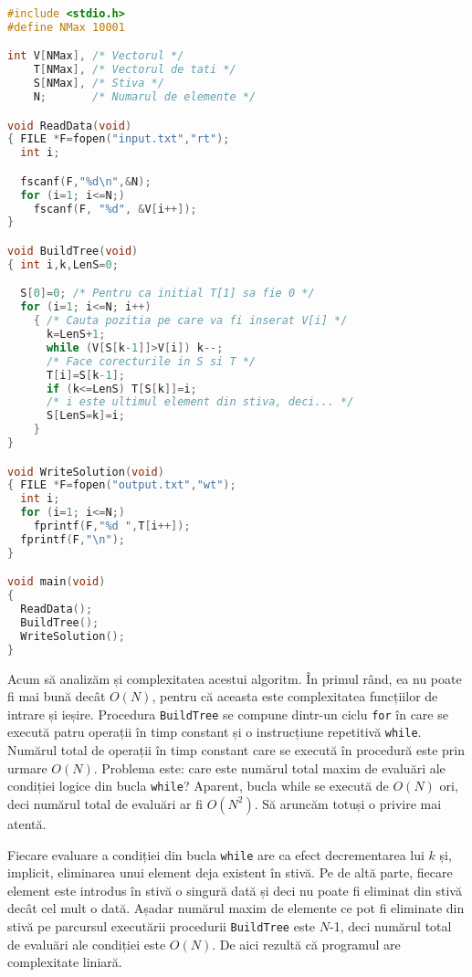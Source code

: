 \begin{lstlisting}[language=C]
#include <stdio.h>
#define NMax 10001

int V[NMax], /* Vectorul */
    T[NMax], /* Vectorul de tati */
    S[NMax], /* Stiva */
    N;       /* Numarul de elemente */

void ReadData(void)
{ FILE *F=fopen("input.txt","rt");
  int i;

  fscanf(F,"%d\n",&N);
  for (i=1; i<=N;)
    fscanf(F, "%d", &V[i++]);
}

void BuildTree(void)
{ int i,k,LenS=0;

  S[0]=0; /* Pentru ca initial T[1] sa fie 0 */
  for (i=1; i<=N; i++)
    { /* Cauta pozitia pe care va fi inserat V[i] */
      k=LenS+1;
      while (V[S[k-1]]>V[i]) k--;
      /* Face corecturile in S si T */
      T[i]=S[k-1];
      if (k<=LenS) T[S[k]]=i;
      /* i este ultimul element din stiva, deci... */
      S[LenS=k]=i;
    }
}

void WriteSolution(void)
{ FILE *F=fopen("output.txt","wt");
  int i;
  for (i=1; i<=N;)
    fprintf(F,"%d ",T[i++]);
  fprintf(F,"\n");
}

void main(void)
{
  ReadData();
  BuildTree();
  WriteSolution();
}
\end{lstlisting}

Acum să analizăm și complexitatea acestui algoritm. În primul rând, ea nu poate fi mai bună decât $O(N)$, pentru că aceasta este complexitatea funcțiilor de intrare și ieșire. Procedura {\tt BuildTree} se compune dintr-un ciclu {\tt for} în care se execută patru operații în timp constant și o instrucțiune repetitivă {\tt while}. Numărul total de operații în timp constant care se execută în procedură este prin urmare $O(N)$. Problema este: care este numărul total maxim de evaluări ale condiției logice din bucla {\tt while}? Aparent, bucla while se execută de $O(N)$ ori, deci numărul total de evaluări ar fi $O(N^2)$. Să aruncăm totuși o privire mai atentă.

Fiecare evaluare a condiției din bucla {\tt while} are ca efect decrementarea lui $k$ și, implicit, eliminarea unui element deja existent în stivă. Pe de altă parte, fiecare element este introdus în stivă o singură dată și deci nu poate fi eliminat din stivă decât cel mult o dată. Așadar numărul maxim de elemente ce pot fi eliminate din stivă pe parcursul executării procedurii {\tt BuildTree} este $N$-1, deci numărul total de evaluări ale condiției este $O(N)$. De aici rezultă că programul are complexitate liniară.


